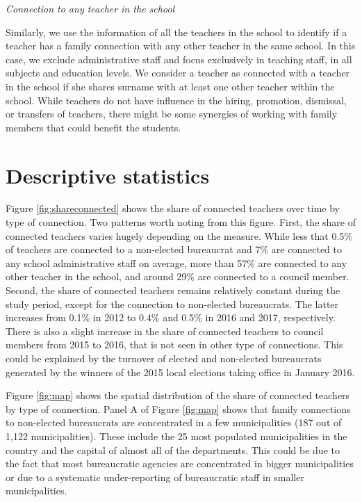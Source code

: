 \documentclass[12pt,runningheads]{article}
\begin{document}
\noindent \textit{Connection to any teacher in the school}

Similarly, we use the information of all the teachers in the school to identify if a teacher has a family connection with any other teacher in the same school. In this case, we exclude administrative staff and focus exclusively in teaching staff, in all subjects and education levels. We consider a teacher as connected with a teacher in the school if she shares surname with at least one other teacher within the school. While teachers do not have influence in the hiring, promotion, dismissal, or transfers of teachers, there might be some synergies of working with family members that could benefit the students.

\section{Descriptive statistics} 

Figure \ref{fig:shareconnected} shows the share of connected teachers over time by type of connection. Two patterns worth noting from this figure. First,
the share of connected teachers varies hugely depending on the measure. While less that 0.5\% of teachers are connected to a non-elected bureaucrat and 7\% are connected to any school administrative staff on average, more than 57\% are connected to any other teacher in the school, and around 29\% are connected to a council member. Second, the share of connected teachers remains relatively constant during the study period, except for the connection to non-elected bureaucrats. The latter increases from 0.1\% in 2012 to 0.4\% and 0.5\% in 2016 and 2017, respectively. There is also a slight increase in the share of connected teachers to council members from 2015 to 2016, that is not seen in other type of connections. This could be explained by the turnover of elected and non-elected bureaucrats generated by the winners of the 2015 local elections taking office in January 2016.

Figure \ref{fig:map} shows the spatial distribution of the share of connected teachers by type of connection. Panel A of Figure \ref{fig:map} shows that family connections to non-elected bureaucrats are concentrated in a few municipalities (187 out of 1,122 municipalities). These include the 25 most populated municipalities in the country and the capital of almost all of the departments. This could be due to the fact that most bureaucratic agencies are concentrated in bigger municipalities or due to a systematic under-reporting of bureaucratic staff in smaller municipalities.
\end{document}
